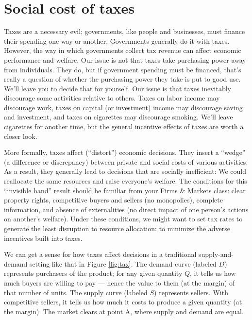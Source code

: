 \section{Social cost of taxes}
\label{sec:triangle}

Taxes are a necessary evil;
governments, like people and businesses,
must finance their spending one way or another.
Governments generally do it with taxes.
However, the way in which governments collect tax revenue
can affect economic performance and welfare.
Our issue is not that taxes take purchasing power
away from individuals.
They do, but if government spending must be financed,
that's really a question of whether the purchasing power they take is put to good use.
We'll leave you to decide that for yourself.
Our issue is that taxes inevitably
discourage some activities relative to others.
Taxes on labor income may discourage work,
taxes on capital (or investment) income may discourage saving and investment,
and taxes on cigarettes may discourage smoking.
We'll leave cigarettes for another time,
but the general incentive effects of taxes are worth a closer look.

More formally,
taxes affect (``distort'') economic decisions.
They insert a ``wedge'' (a difference or discrepancy) between
private and social costs of various activities.
As a result, they generally lead to decisions that are socially inefficient:
We could reallocate the same resources and raise everyone's welfare.
The conditions for this ``invisible hand'' result should be
familiar from your
Firms \& Markets class:
clear property rights,
competitive buyers and sellers (no monopolies),
complete information,
and absence of externalities
(no direct impact of one person's actions on another's welfare).
Under these conditions,
we might want to set tax rates
to generate the least disruption to resource allocation:
to minimize the adverse incentives built into taxes.

We can get a sense for how taxes affect decisions
in a traditional supply-and-demand setting like that
in Figure \ref{fig:tax}.
The demand curve (labeled $D$) represents purchasers of the product;
for any given quantity $Q$, it tells us how much buyers are willing to
pay --- hence the value to them (at the margin) of that number of units.
The supply curve (labeled $S$) represents sellers.
With competitive sellers, it tells us how much it costs to produce
a given quantity (at the margin).
The market clears at point A, where supply and demand are equal.

